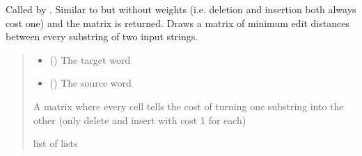 \documentclass[letterpaper,10pt,english]{sphinxmanual}
\begin{document}
\begin{fulllineitems}
\label{\detokenize{documentation:loanpy.scapplier.get_mtx}}
\pysigstartsignatures
{}
\pysigstopsignatures
\sphinxAtStartPar
Called by . Similar to
 but without
weights (i.e. deletion and insertion both always cost one) and the matrix
is returned. Draws a matrix of minimum edit distances between every
substring of two input strings.
\begin{quote}\begin{description}
\begin{itemize}
\item {} 
\sphinxAtStartPar
{} (\sphinxstyleliteralemphasis{\sphinxupquote{, }}) \textendash{} The target word

\item {} 
\sphinxAtStartPar
{} (\sphinxstyleliteralemphasis{\sphinxupquote{, }}) \textendash{} The source word

\end{itemize}

\sphinxAtStartPar
A matrix where every cell tells the cost of turning one
substring into the other (only delete and insert with cost 1 for
each)

\sphinxAtStartPar
list of lists

\end{description}\end{quote}

\sphinxAtStartPar
{}


\end{fulllineitems}
\end{document}
